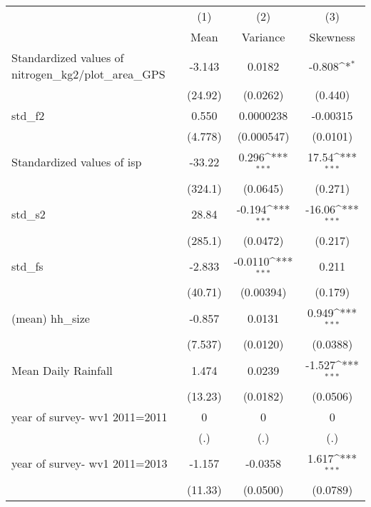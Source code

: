 {
\def\sym#1{\ifmmode^{#1}\else\(^{#1}\)\fi}
\begin{tabular}{l*{3}{c}}
\toprule
                &\multicolumn{1}{c}{(1)}&\multicolumn{1}{c}{(2)}&\multicolumn{1}{c}{(3)}\\
                &\multicolumn{1}{c}{Mean}&\multicolumn{1}{c}{Variance}&\multicolumn{1}{c}{Skewness}\\
\midrule
Standardized values of nitrogen\_kg2/plot\_area\_GPS&   -3.143         &   0.0182         &   -0.808\sym{*}  \\
                &  (24.92)         & (0.0262)         &  (0.440)         \\
\addlinespace
std\_f2          &    0.550         &0.0000238         & -0.00315         \\
                &  (4.778)         &(0.000547)         & (0.0101)         \\
\addlinespace
Standardized values of isp&   -33.22         &    0.296\sym{***}&    17.54\sym{***}\\
                &  (324.1)         & (0.0645)         &  (0.271)         \\
\addlinespace
std\_s2          &    28.84         &   -0.194\sym{***}&   -16.06\sym{***}\\
                &  (285.1)         & (0.0472)         &  (0.217)         \\
\addlinespace
std\_fs          &   -2.833         &  -0.0110\sym{***}&    0.211         \\
                &  (40.71)         &(0.00394)         &  (0.179)         \\
\addlinespace
(mean) hh\_size  &   -0.857         &   0.0131         &    0.949\sym{***}\\
                &  (7.537)         & (0.0120)         & (0.0388)         \\
\addlinespace
Mean Daily Rainfall&    1.474         &   0.0239         &   -1.527\sym{***}\\
                &  (13.23)         & (0.0182)         & (0.0506)         \\
\addlinespace
year of survey- wv1 2011=2011&        0         &        0         &        0         \\
                &      (.)         &      (.)         &      (.)         \\
\addlinespace
year of survey- wv1 2011=2013&   -1.157         &  -0.0358         &    1.617\sym{***}\\
                &  (11.33)         & (0.0500)         & (0.0789)         \\

\end{tabular}}
